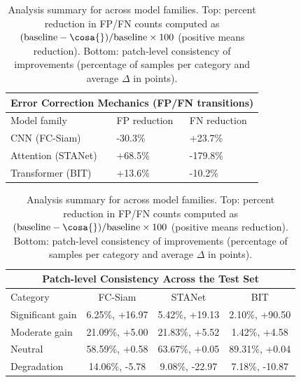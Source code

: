 \begin{table}[H]
  \centering
  \caption{Analysis summary for \cosa{} across model families. Top: percent reduction in FP/FN counts computed as $(\mathrm{baseline}-\mathrm{\cosa{}})/\mathrm{baseline}\times100$ (positive means reduction). Bottom: patch-level consistency of \cosa{} improvements (percentage of samples per category and average $\Delta$\Fonec{} in points).}
  \label{tab:analysis_combined}
  \scriptsize

  \setlength{\tabcolsep}{4pt}
  \renewcommand{\arraystretch}{1.05}
  \begin{tabular}{l l l}
    \toprule
    \multicolumn{3}{c}{\textbf{Error Correction Mechanics (FP/FN transitions)}} \\
    \midrule
    Model family & FP reduction & FN reduction \\
    \midrule
    CNN (FC-Siam) & -30.3\% & +23.7\% \\
    Attention (STANet) & +68.5\% & -179.8\% \\
    Transformer (BIT) & +13.6\% & -10.2\% \\
    \bottomrule
  \end{tabular}

  \vspace{4pt}

  \setlength{\tabcolsep}{3pt}
  \begin{tabular}{l c c c}
    \toprule
    \multicolumn{4}{c}{\textbf{Patch-level Consistency Across the Test Set}} \\
    \midrule
    Category & FC-Siam & STANet & BIT \\
    \midrule
    Significant gain & 6.25\%, +16.97 & 5.42\%, +19.13 & 2.10\%, +90.50 \\
    Moderate gain & 21.09\%, +5.00 & 21.83\%, +5.52 & 1.42\%, +4.58 \\
    Neutral & 58.59\%, +0.58 & 63.67\%, +0.05 & 89.31\%, +0.04 \\
    Degradation & 14.06\%, -5.78 & 9.08\%, -22.97 & 7.18\%, -10.87 \\
    \bottomrule
  \end{tabular}
\end{table}
